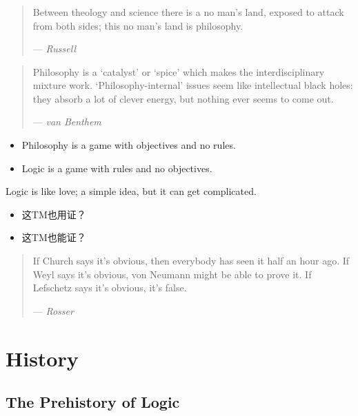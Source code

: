 \documentclass[UTF8,aspectratio=43,11pt,colorlinks,compress,openany]{beamer}%
\begin{document}
\begin{frame}\frametitle{}
\begin{quote}
Between theology and science there is a no man's land, exposed to attack from both sides; this no man's land is philosophy.\par\hfill --- \textsl{Russell}
\end{quote}
\begin{quote}
Philosophy is a `catalyst' or `spice' which makes the interdisciplinary mixture work. `Philosophy-internal' issues seem like intellectual black holes: they absorb a lot of clever energy, but nothing ever seems to come out.\par\hfill --- \textsl{van Benthem}
\end{quote}
	\begin{itemize}
		\item Philosophy is a game with objectives and no rules.
		\item Logic is a game with rules and no objectives. 
	\end{itemize}
	\begin{block}{Logic is like love; a simple idea, but it can get complicated.}
		\begin{itemize}
			\item 这TM也用证？
			\item 这TM也能证？
		\end{itemize}
	\end{block}
	\begin{quote}
		If Church says it's obvious, then everybody has seen it half an hour ago. If Weyl says it's obvious, von Neumann might be able to prove it. If Lefschetz says it's obvious, it's false.\par\hfill --- \textsl{Rosser}
	\end{quote}
\end{frame}


\section{History}


\subsection{The Prehistory of Logic}
\end{document}
